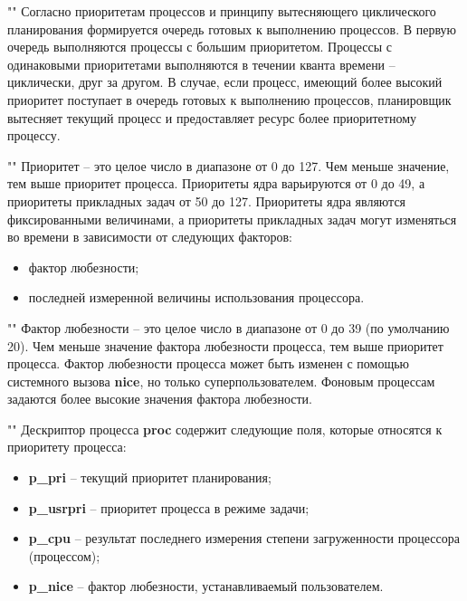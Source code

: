 ""\newline
\noindent Согласно приоритетам процессов и принципу вытесняющего циклического планирования формируется очередь готовых к выполнению процессов. В первую очередь выполняются процессы с большим приоритетом. Процессы с одинаковыми приоритетами выполняются в течении кванта времени -- циклически, друг за другом. В случае, если процесс, имеющий более высокий приоритет поступает в очередь готовых к выполнению процессов, планировщик вытесняет текущий процесс и предоставляет ресурс более приоритетному процессу.

""\newline
\noindent Приоритет -- это целое число в диапазоне от 0 до 127. Чем меньше значение, тем выше приоритет процесса. Приоритеты ядра варьируются от 0 до 49, а приоритеты прикладных задач от 50 до 127. Приоритеты ядра являются фиксированными величинами, а приоритеты прикладных задач могут изменяться во времени в зависимости от следующих факторов:

\begin{itemize}
    \item фактор любезности;
    \item последней измеренной величины использования процессора.
\end{itemize}

""\newline
\noindent Фактор любезности -- это целое число в диапазоне от 0 до 39 (по умолчанию 20). Чем меньше значение фактора любезности процесса, тем выше приоритет процесса. Фактор любезности процесса может быть изменен с помощью системного вызова \textbf{nice}, но только суперпользователем. Фоновым процессам задаются более высокие значения фактора любезности.

""\newline
\noindent Дескриптор процесса \textbf{proc} содержит следующие поля, которые относятся к приоритету процесса:

\begin{itemize}
    \item \textbf{p\_pri} -- текущий приоритет планирования;
    \item \textbf{p\_usrpri} -- приоритет процесса в режиме задачи;
    \item \textbf{p\_cpu} -- результат последнего измерения степени загруженности процессора (процессом);
    \item \textbf{p\_nice} -- фактор любезности, устанавливаемый пользователем.
\end{itemize}

